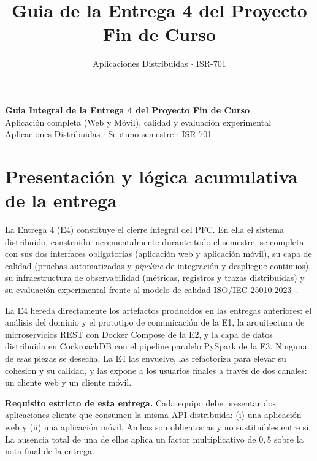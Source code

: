 \documentclass[11pt,a4paper]{article}
\title{Guia de la Entrega 4 del Proyecto Fin de Curso}
\author{Aplicaciones Distribuidas $\cdot$ ISR-701}
\date{}
\begin{document}
\thispagestyle{fancy}

\begin{center}
    {\Large\bfseries\color{uteqBlue} Guia Integral de la Entrega 4 del Proyecto Fin de Curso}\\[2pt]
    {\normalsize\color{uteqGray} Aplicación completa (Web y Móvil), calidad y evaluación experimental}\\[2pt]
    {\small Aplicaciones Distribuidas $\cdot$ Septimo semestre $\cdot$ ISR-701}
\end{center}
\vspace{0.4em}


\section{Presentación y lógica acumulativa de la entrega}

    La Entrega 4 (E4) constituye el cierre integral del PFC. En ella el sistema distribuido, construido incrementalmente durante todo el semestre, se completa con sus dos interfaces obligatorias (aplicación web y aplicación móvil), su capa de calidad (pruebas automatizadas y \textit{pipeline} de integración y despliegue continuos), su infraestructura de observabilidad (métricas, registros y trazas distribuidas) y su evaluación experimental frente al modelo de calidad ISO/IEC 25010:2023~\cite{ISO25010_2023}.
    
    La E4 hereda directamente los artefactos producidos en las entregas anteriores: el análisis del dominio y el prototipo de comunicación de la E1, la arquitectura de microservicios REST con Docker Compose de la E2, y la capa de datos distribuida en CockroachDB con el pipeline paralelo PySpark de la E3. Ninguna de esas piezas se desecha. La E4 las envuelve, las refactoriza para elevar su cohesion y su calidad, y las expone a los usuarios finales a través de dos canales: un cliente web y un cliente móvil.
    
    \begin{critBox}
        \textbf{Requisito estricto de esta entrega.} Cada equipo debe presentar dos aplicaciones cliente que consumen la misma API distribuida: (i) una aplicación web y (ii) una aplicación móvil. Ambas son obligatorias y no sustituibles entre si. La ausencia total de una de ellas aplica un factor multiplicativo de $0{,}5$ sobre la nota final de la entrega.
    \end{critBox}
    
\end{document}
